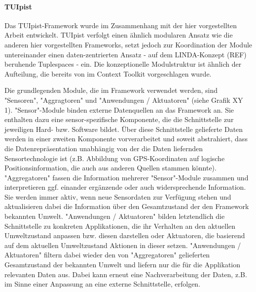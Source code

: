 \paragraph{TUIpist} %
\label{par:tuipist}

Das TUIpist-Framework \citep{Furtmuller07} wurde im Zusammenhang mit der hier vorgestellten Arbeit entwickelt\citep{Furtmuller07a}. TUIpist verfolgt einen ähnlich modularen Ansatz wie die anderen hier vorgestellten Frameworks, setzt jedoch zur Koordination der Module untereinander einen daten-zentrierten Ansatz - auf dem LINDA-Konzept (REF) beruhende Tuplespaces - ein. Die konzeptionelle Modulstruktur ist ähnlich der Aufteilung, die bereits von \citet{Dey01} im Context Toolkit vorgeschlagen wurde.

Die grundlegenden Module, die im Framework verwendet werden, sind "Sensoren", "Aggragtoren" und "Anwendungen / Aktuatoren" (siehe Grafik XY 1). "Sensor"-Module binden externe Datenquellen an das Framework an. Sie enthalten dazu eine sensor-spezifische Komponente, die die Schnittstelle zur jeweiligen Hard- bzw. Software bildet. Über diese Schnittstelle gelieferte Daten werden in einer zweiten Komponente vorverarbeitet und soweit abstrahiert, dass die Datenrepräsentation unabhängig von der die Daten liefernden Sensortechnologie ist (z.B. Abbildung von GPS-Koordinaten auf logische Positionsinformation, die auch aus anderen Quellen stammen könnte). "Aggregatoren" fassen die Information mehrerer "Sensor"-Module zusammen und interpretieren ggf. einander ergänzende oder auch widersprechende Information. Sie werden immer aktiv, wenn neue Sensordaten zur Verfügung stehen und aktualisieren dabei die Information über den Gesamtzustand der den Framework bekannten Umwelt. "Anwendungen / Aktuatoren" bilden letztendlich die Schnittstelle zu konkreten Applikationen, die ihr Verhalten an den aktuellen Umweltzustand anpassen bzw. diesen darstellen oder Aktuatoren, die basierend auf dem aktuellen Umweltzustand Aktionen in dieser setzen. "Anwendungen / Aktuatoren" filtern dabei wieder den von "Aggregatoren" gelieferten Gesamtzustand der bekannten Umwelt und liefern nur die für die Applikation relevanten Daten aus. Dabei kann erneut eine Nachverarbeitung der Daten, z.B. im Sinne einer Anpassung an eine externe Schnittstelle, erfolgen.

